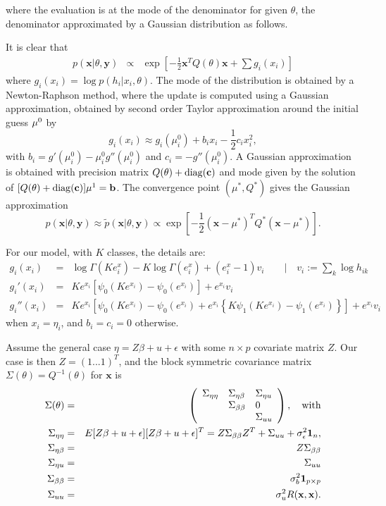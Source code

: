 \documentclass[10pt, onecolumn]{article}
\newcommand{\x}{\mathbf{x}}
\newcommand{\y}{\mathbf{y}}
\begin{document}
where the evaluation is at the mode of the denominator for given $\theta$, the denominator  approximated by a Gaussian distribution as follows.

It is clear that 
\begin{eqnarray}
p(\x | \theta, \y)&\propto& \exp \left[-\frac{1}{2}\x^T Q(\theta)\x + \sum g_i(x_i) \right]
\end{eqnarray}
where $g_i(x_i)=\log p(h_i|x_i,\theta)$. The mode of the distribution is obtained by a Newton-Raphson method, where the update is computed using a Gaussian approximation, obtained by second order Taylor approximation around the initial guess $\bold\mu^0$ by
\[
g_i(x_i)\approx g_i(\mu_i^0) + b_i x_i - \frac{1}{2}c_i x_i^2,
\]
with $b_i = g'(\mu_i^0)- \mu_i^0 g''(\mu_i^0)$ and $c_i=-g''(\mu_i^0)$. A Gaussian approximation is obtained with precision matrix $Q(\theta)+\mathrm{diag}(\bold c)$ and mode given by the solution of $[Q(\theta) + \mathrm{diag}(\bold c)]\bold\mu^1=\bold b$. 
The convergence point $(\mu^*, Q^*)$ gives the Gaussian approximation
\begin{equation}
p(\x|\theta, \y)\approx \tilde p(\x|\theta, \y) \propto \exp \left[-\frac{1}{2}(\x-\mu^*)^T Q^*(\x-\mu^*)\right].
\end{equation}

For our model, with $K$ classes, the details are:
\begin{eqnarray}
g_i(x_i) &=& \log \Gamma(Ke^x_i) - K\log \Gamma(e^x_i) +(e^x_i - 1) v_i \qquad |\quad  v_i := \sum_k \log h_{ik}\\
g_i'(x_i) &=& Ke^{x_i}\left[\psi_0(Ke^{x_i})-\psi_0(e^{x_i})\right]+e^{x_i} v_i\\
g_i''(x_i)&=& Ke^{x_i}\left[\psi_0(Ke^{x_i})-\psi_0(e^{x_i}) + e^{x_i}\left\{K\psi_1(Ke^{x_i})-\psi_1(e^{x_i})\right\}\right] + e^{x_i}v_i
\end{eqnarray}
when $x_i=\eta_i$, and $b_i=c_i=0$ otherwise. 

Assume the general case $\eta=Z\beta + u + \epsilon$ with some $n\times p$ covariate matrix $Z$. Our case is then $Z=(1...1)^T$, and the block symmetric covariance matrix $\Sigma(\theta)=Q^{-1}(\theta)$ for $\x$ is
\begin{eqnarray}
\Sigma(\theta) &=& \left(\begin{array}{lll} \Sigma_{\eta\eta} & \Sigma_{\eta\beta} & \Sigma_{\eta u}\\  & \Sigma_{\beta\beta}& 0 \\
& & \Sigma_{uu} \end{array}\right), \quad\mathrm{with}\\
\Sigma_{\eta\eta} &=& E[Z\beta+u+\epsilon][Z\beta+u+\epsilon]^T = Z\Sigma_{\beta\beta}Z^T + \Sigma_{uu} + \sigma_\epsilon^2 \bold 1_{n}, \\
\Sigma_{\eta\beta} &=& Z\Sigma_{\beta\beta}\\
\Sigma_{\eta u}&=&\Sigma_{uu} \\
\Sigma_{\beta\beta}&=&\sigma^2_b \bold 1_{p\times p}\\
\Sigma_{uu} &=& \sigma_u^2 R(\x,\x).
\end{eqnarray}
\end{document}
